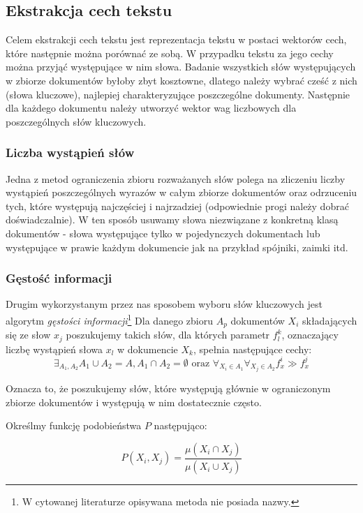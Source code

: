 \documentclass{classrep}
\begin{document}
\subsection{Ekstrakcja cech tekstu}
Celem ekstrakcji cech tekstu jest reprezentacja tekstu w postaci wektorów cech, które następnie można porównać ze sobą. W przypadku tekstu za jego cechy można przyjąć występujące w nim słowa. Badanie wszystkich słów występujących w zbiorze dokumentów byłoby zbyt kosztowne, dlatego należy wybrać cześć z nich (słowa kluczowe), najlepiej charakteryzujące poszczególne dokumenty. Następnie dla każdego dokumentu należy utworzyć wektor wag liczbowych dla poszczególnych słów kluczowych.

\subsubsection{Liczba wystąpień słów}
Jedna z metod ograniczenia zbioru rozważanych słów polega na zliczeniu liczby wystąpień poszczególnych wyrazów w całym zbiorze dokumentów oraz odrzuceniu tych, które występują najczęściej i najrzadziej (odpowiednie progi należy dobrać doświadczalnie). W ten sposób usuwamy słowa niezwiązane z konkretną klasą dokumentów - słowa występujące tylko w pojedynczych dokumentach lub występujące w prawie każdym dokumencie jak na przykład spójniki, zaimki itd.


\subsubsection{Gęstość informacji}
Drugim wykorzystanym przez nas sposobem wyboru słów kluczowych jest algorytm \textit{gęstości informacji}\footnote{W cytowanej literaturze opisywana metoda nie posiada nazwy.}
Dla danego zbioru $A_p$ dokumentów $X_i$ składających się ze słow $x_j$ poszukujemy takich słów, dla których parametr $f^k_l$, oznaczający liczbę wystąpień słowa $x_l$ w dokumencie $X_k$, spełnia następujące cechy:
\begin{equation}
 \exists_{A_1, A_2} A_1 \cup A_2 = A, A_1 \cap A_2 = \emptyset \mbox{ oraz } \forall_{X_i \in A_1} \forall_{X_j \in A_2} f^i_x \gg f^j_x
\end{equation}

Oznacza to, że poszukujemy słów, które występują głównie w ograniczonym zbiorze dokumentów i występują w nim dostatecznie często.

Określmy funkcję podobieństwa $P$ następująco:

\begin{equation}
 P(X_i, X_j) = \frac {\mu(X_i \cap X_j)} {\mu(X_i \cup X_j)}
\end{equation}
\end{document}
